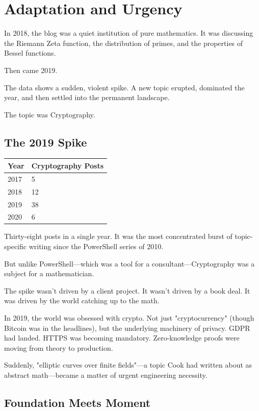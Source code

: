 \chapter{Adaptation and Urgency}

In 2018, the blog was a quiet institution of pure mathematics. It was discussing the Riemann Zeta function, the distribution of primes, and the properties of Bessel functions.

Then came 2019.

The data shows a sudden, violent spike. A new topic erupted, dominated the year, and then settled into the permanent landscape.

The topic was Cryptography.

\bigskip

\section*{The 2019 Spike}

\begin{longtable}{l p{6.5cm}}
\toprule
\textbf{Year} & \textbf{Cryptography Posts} \tabularnewline
\midrule
2017 & 5 \tabularnewline
2018 & 12 \tabularnewline
2019 & 38 \tabularnewline
2020 & 6 \tabularnewline
\bottomrule
\end{longtable}


Thirty-eight posts in a single year. It was the most concentrated burst of topic-specific writing since the PowerShell series of 2010.

But unlike PowerShell---which was a tool for a consultant---Cryptography was a subject for a mathematician.

The spike wasn't driven by a client project. It wasn't driven by a book deal. It was driven by the world catching up to the math.

In 2019, the world was obsessed with crypto. Not just "cryptocurrency" (though Bitcoin was in the headlines), but the underlying machinery of privacy. GDPR had landed. HTTPS was becoming mandatory. Zero-knowledge proofs were moving from theory to production.

Suddenly, "elliptic curves over finite fields"---a topic Cook had written about as abstract math---became a matter of urgent engineering necessity.

\bigskip

\section*{Foundation Meets Moment}

